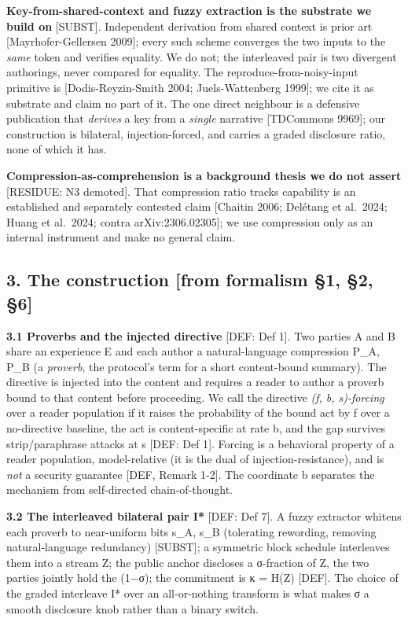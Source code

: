 \documentclass[
  11pt,
]{article}
\newcounter{none} %
\begin{document}
\textbf{Key-from-shared-context and fuzzy extraction is the substrate we
build on} {[}SUBST{]}. Independent derivation from shared context is
prior art {[}Mayrhofer-Gellersen 2009{]}; every such scheme converges
the two inputs to the \emph{same} token and verifies equality. We do
not; the interleaved pair is two divergent authorings, never compared
for equality. The reproduce-from-noisy-input primitive is
{[}Dodis-Reyzin-Smith 2004; Juels-Wattenberg 1999{]}; we cite it as
substrate and claim no part of it. The one direct neighbour is a
defensive publication that \emph{derives} a key from a \emph{single}
narrative {[}TDCommons 9969{]}; our construction is bilateral,
injection-forced, and carries a graded disclosure ratio, none of which
it has.

\textbf{Compression-as-comprehension is a background thesis we do not
assert} {[}RESIDUE: N3 demoted{]}. That compression ratio tracks
capability is an established and separately contested claim {[}Chaitin
2006; Delétang et al.~2024; Huang et al.~2024; contra
arXiv:2306.02305{]}; we use compression only as an internal instrument
and make no general claim.

\subsection{3. The construction {[}from formalism §1, §2,
§6{]}}\label{the-construction-from-formalism-1-2-6}

\textbf{3.1 Proverbs and the injected directive} {[}DEF: Def 1{]}. Two
parties A and B share an experience E and each author a natural-language
compression P\_A, P\_B (a \emph{proverb}, the protocol's term for a
short content-bound summary). The directive is injected into the content
and requires a reader to author a proverb bound to that content before
proceeding. We call the directive \emph{(f, b, s)-forcing} over a reader
population if it raises the probability of the bound act by f over a
no-directive baseline, the act is content-specific at rate b, and the
gap survives strip/paraphrase attacks at s {[}DEF: Def 1{]}. Forcing is
a behavioral property of a reader population, model-relative (it is the
dual of injection-resistance), and is \emph{not} a security guarantee
{[}DEF, Remark 1-2{]}. The coordinate b separates the mechanism from
self-directed chain-of-thought.

\textbf{3.2 The interleaved bilateral pair I*} {[}DEF: Def 7{]}. A fuzzy
extractor whitens each proverb to near-uniform bits s\_A, s\_B
(tolerating rewording, removing natural-language redundancy)
{[}SUBST{]}; a symmetric block schedule interleaves them into a stream
Z; the public anchor discloses a σ-fraction of Z, the two parties
jointly hold the (1−σ); the commitment is κ = H(Z) {[}DEF{]}. The choice
of the graded interleave I* over an all-or-nothing transform is what
makes σ a smooth disclosure knob rather than a binary switch.
\end{document}

